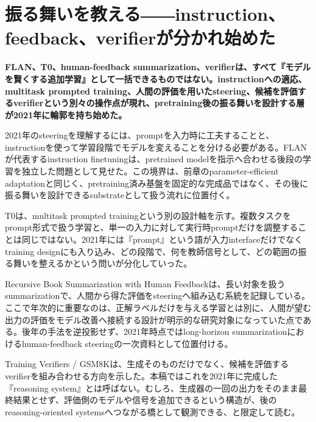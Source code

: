 \section{振る舞いを教える――instruction、feedback、verifierが分かれ始めた}
\noindent\textbf{FLAN、T0、human-feedback summarization、verifierは、すべて『モデルを賢くする追加学習』として一括できるものではない。instructionへの適応、multitask prompted training、人間の評価を用いたsteering、候補を評価するverifierという別々の操作点が現れ、pretraining後の振る舞いを設計する層が2021年に輪郭を持ち始めた。}\autocite{src-34f845c1e710,src-6339600396eb,src-750bc3eeb1bc,src-7f768525daf5,src-8b2f7c40f4a4,src-90a37f62aeab}

2021年のsteeringを理解するには、promptを入力時に工夫することと、instructionを使って学習段階でモデルを変えることを分ける必要がある。FLANが代表するinstruction finetuningは、pretrained modelを指示へ合わせる後段の学習を独立した問題として見せた。この境界は、前章のparameter-efficient adaptationと同じく、pretraining済み基盤を固定的な完成品ではなく、その後に振る舞いを設計できるsubstrateとして扱う流れに位置付く。\autocite{src-8b2f7c40f4a4}


T0は、multitask prompted trainingという別の設計軸を示す。複数タスクをprompt形式で扱う学習と、単一の入力に対して実行時promptだけを調整することは同じではない。2021年には『prompt』という語が入力interfaceだけでなくtraining designにも入り込み、どの段階で、何を教師信号として、どの範囲の振る舞いを整えるかという問いが分化していった。\autocite{src-6339600396eb}


Recursive Book Summarization with Human Feedbackは、長い対象を扱うsummarizationで、人間から得た評価をsteeringへ組み込む系統を記録している。ここで年次的に重要なのは、正解ラベルだけを与える学習とは別に、人間が望む出力の評価をモデル改善へ接続する設計が明示的な研究対象になっていた点である。後年の手法を逆投影せず、2021年時点ではlong-horizon summarizationにおけるhuman-feedback steeringの一次資料として位置付ける。\autocite{src-7f768525daf5,src-90a37f62aeab}


Training Verifiers / GSM8Kは、生成そのものだけでなく、候補を評価するverifierを組み合わせる方向を示した。本稿ではこれを2021年に完成した『reasoning system』とは呼ばない。むしろ、生成器の一回の出力をそのまま最終結果とせず、評価側のモデルや信号を追加できるという構造が、後のreasoning-oriented systemsへつながる橋として観測できる、と限定して読む。\autocite{src-34f845c1e710,src-750bc3eeb1bc}


